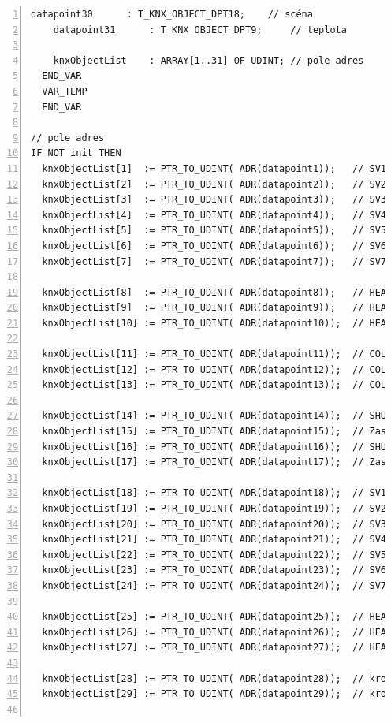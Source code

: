 \begin{lstlisting}[language=ST, breaklines=true, numbers=left, numberstyle=\small, numbersep=10pt, frame=single, basicstyle=\ttfamily\small, caption={Program komunikace mezi PLC a KNX}, label={lst:prgKNXComm}]
    datapoint30      : T_KNX_OBJECT_DPT18;    // scéna
    datapoint31      : T_KNX_OBJECT_DPT9;     // teplota

    knxObjectList    : ARRAY[1..31] OF UDINT; // pole adres
  END_VAR
  VAR_TEMP
  END_VAR
  
// pole adres
IF NOT init THEN
  knxObjectList[1]  := PTR_TO_UDINT( ADR(datapoint1));   // SV1_FB
  knxObjectList[2]  := PTR_TO_UDINT( ADR(datapoint2));   // SV2_FB
  knxObjectList[3]  := PTR_TO_UDINT( ADR(datapoint3));   // SV3_FB
  knxObjectList[4]  := PTR_TO_UDINT( ADR(datapoint4));   // SV4_FB
  knxObjectList[5]  := PTR_TO_UDINT( ADR(datapoint5));   // SV5_FB
  knxObjectList[6]  := PTR_TO_UDINT( ADR(datapoint6));   // SV6_FB
  knxObjectList[7]  := PTR_TO_UDINT( ADR(datapoint7));   // SV7_FB

  knxObjectList[8]  := PTR_TO_UDINT( ADR(datapoint8));   // HEAT1_FB
  knxObjectList[9]  := PTR_TO_UDINT( ADR(datapoint9));   // HEAT2_FB
  knxObjectList[10] := PTR_TO_UDINT( ADR(datapoint10));  // HEAT3_FB

  knxObjectList[11] := PTR_TO_UDINT( ADR(datapoint11));  // COLD1_FB
  knxObjectList[12] := PTR_TO_UDINT( ADR(datapoint12));  // COLD2_FB
  knxObjectList[13] := PTR_TO_UDINT( ADR(datapoint13));  // COLD3_FB

  knxObjectList[14] := PTR_TO_UDINT( ADR(datapoint14));  // SHUT1_FB
  knxObjectList[15] := PTR_TO_UDINT( ADR(datapoint15));  // Zastarale
  knxObjectList[16] := PTR_TO_UDINT( ADR(datapoint16));  // SHUT2_FB
  knxObjectList[17] := PTR_TO_UDINT( ADR(datapoint17));  // Zastarale

  knxObjectList[18] := PTR_TO_UDINT( ADR(datapoint18));  // SV1_CMD
  knxObjectList[19] := PTR_TO_UDINT( ADR(datapoint19));  // SV2_CMD
  knxObjectList[20] := PTR_TO_UDINT( ADR(datapoint20));  // SV3_CMD
  knxObjectList[21] := PTR_TO_UDINT( ADR(datapoint21));  // SV4_CMD
  knxObjectList[22] := PTR_TO_UDINT( ADR(datapoint22));  // SV5_CMD
  knxObjectList[23] := PTR_TO_UDINT( ADR(datapoint23));  // SV6_CMD
  knxObjectList[24] := PTR_TO_UDINT( ADR(datapoint24));  // SV7_CMD

  knxObjectList[25] := PTR_TO_UDINT( ADR(datapoint25));  // HEAT1_CMD
  knxObjectList[26] := PTR_TO_UDINT( ADR(datapoint26));  // HEAT2_CMD
  knxObjectList[27] := PTR_TO_UDINT( ADR(datapoint27));  // HEAT3_CMD

  knxObjectList[28] := PTR_TO_UDINT( ADR(datapoint28));  // krok Žaluzie 1
  knxObjectList[29] := PTR_TO_UDINT( ADR(datapoint29));  // krok Žaluzie 2


\end{lstlisting}
